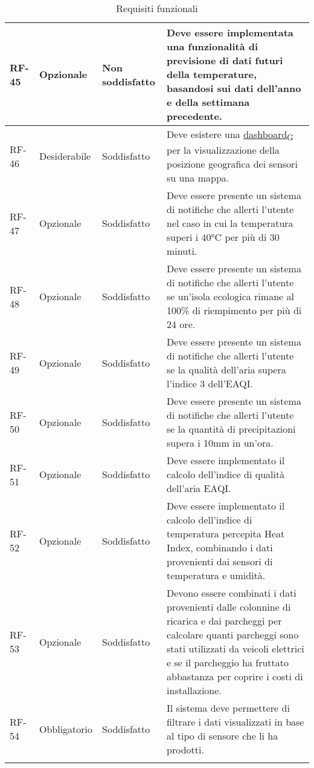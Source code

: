 \begin{longtable}{|>{\centering\arraybackslash}m{}|>{\centering\arraybackslash}m{}|>{\centering\arraybackslash}m{}|>{\centering\arraybackslash}m{}|}
	RF-45           & Opzionale           & Non soddisfatto & Deve essere implementata una funzionalità di previsione di dati futuri della temperature, basandosi sui dati dell'anno e della settimana precedente.
	\\\hline
	RF-46           & Desiderabile        & Soddisfatto & Deve esistere una \href{https://7last.github.io/docs/pb/documentazione-interna/glossario\#dashboard}{dashboard\textsubscript{G}} per la visualizzazione della posizione geografica dei sensori su una mappa.
	\\\hline
	RF-47           & Opzionale           & Soddisfatto & Deve essere presente un sistema di notifiche che allerti l'utente nel caso in cui la temperatura superi i 40°C per più di 30 minuti.
	\\\hline
	RF-48           & Opzionale           & Soddisfatto                                                                                                           & Deve essere presente un sistema di notifiche che allerti l'utente se un'isola ecologica rimane al 100\% di riempimento per più di 24 ore.
	\\\hline
	RF-49           & Opzionale           & Soddisfatto                                                                                                           & Deve essere presente un sistema di notifiche che allerti l'utente se la qualità dell'aria supera l'indice 3 dell'EAQI.
	\\\hline
	RF-50           & Opzionale           & Soddisfatto                                                                                                           & Deve essere presente un sistema di notifiche che allerti l'utente se la quantità di precipitazioni supera i 10mm in un'ora.
	\\\hline
	RF-51           & Opzionale           & Soddisfatto                                                                                                           & Deve essere implementato il calcolo dell'indice di qualità dell'aria EAQI.
	\\\hline
	RF-52           & Opzionale           & Soddisfatto                                                                                                           & Deve essere implementato il calcolo dell'indice di temperatura percepita Heat Index, combinando i dati provenienti dai sensori di temperatura e umidità.
	\\\hline
	RF-53           & Opzionale           & Soddisfatto & Devono essere combinati i dati provenienti dalle colonnine di ricarica e dai parcheggi per calcolare quanti parcheggi sono stati utilizzati da veicoli elettrici e se il parcheggio ha fruttato abbastanza per coprire i costi di installazione.
	\\\hline
	RF-54           & Obbligatorio        & Soddisfatto & Il sistema deve permettere di filtrare i dati visualizzati in base al tipo di sensore che li ha prodotti.
	\\\hline
	\caption{Requisiti funzionali}
\end{longtable}


